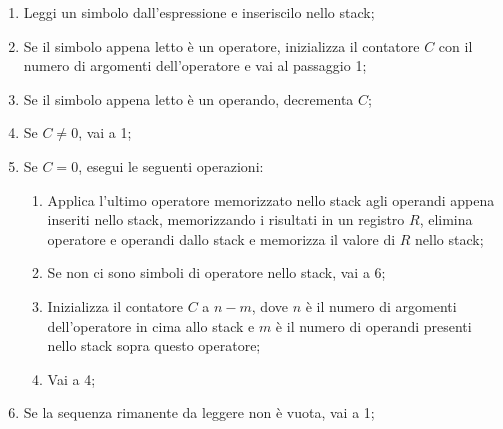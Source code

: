 \begin{enumerate}
    \item Leggi un simbolo dall'espressione e inseriscilo nello stack;
    \item Se il simbolo appena letto è un operatore, inizializza il contatore $C$ con il numero di argomenti dell'operatore e vai al passaggio 1;
    \item Se il simbolo appena letto è un operando, decrementa $C$;
    \item Se $C \neq 0$, vai a 1;
    \item Se $C = 0$, esegui le seguenti operazioni:
        \begin{enumerate}[label=(\alph*)]
            \item Applica l'ultimo operatore memorizzato nello stack agli operandi appena inseriti nello stack, memorizzando i risultati in un registro $R$, elimina operatore e operandi dallo stack e memorizza il valore di $R$ nello stack;
            \item Se non ci sono simboli di operatore nello stack, vai a 6;
            \item Inizializza il contatore $C$ a $n - m$, dove $n$ è il numero di argomenti dell'operatore in cima allo stack e $m$ è il numero di operandi presenti nello stack sopra questo operatore;
            \item Vai a 4;
        \end{enumerate}
    \item Se la sequenza rimanente da leggere non è vuota, vai a 1;
\end{enumerate}

